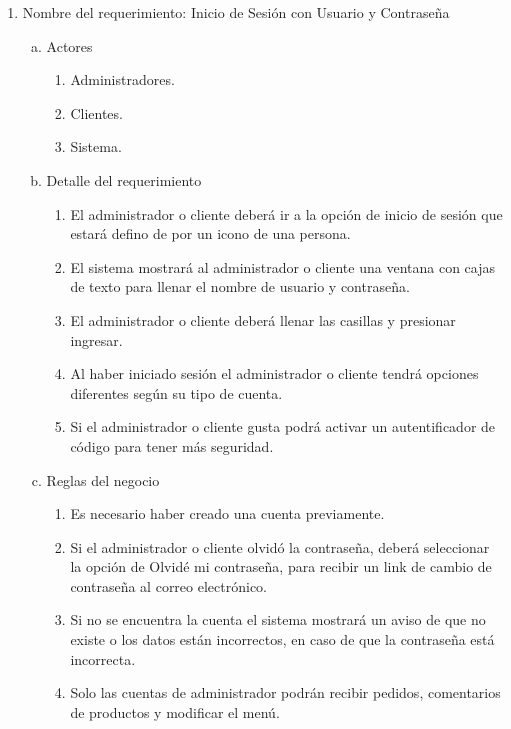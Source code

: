 \documentclass[conference]{IEEEtran}
\begin{document}
\begin{enumerate}
\item Nombre del requerimiento: Inicio de Sesión con Usuario y Contraseña
\begin{enumerate}[a)]
\item Actores
	\begin{enumerate}[a]
	\item Administradores.
	\item Clientes.
	\item Sistema. 
	\end{enumerate}
\item Detalle del requerimiento
	\begin{enumerate}[P{a}so 1.]
	\item El administrador o cliente deberá ir a la opción de inicio de sesión que estará defino de por un icono de una persona. 
	\item El sistema mostrará al administrador o cliente una ventana con cajas de texto para llenar el nombre de usuario y contraseña. 
	\item El administrador o cliente deberá llenar las casillas y presionar ingresar. 
	\item Al haber iniciado sesión el administrador o cliente tendrá opciones diferentes según su tipo de cuenta. 
	\item Si el administrador o cliente gusta podrá activar un autentificador de código para tener más seguridad. 
	\end{enumerate}
\item Reglas del negocio
	\begin{enumerate}[a]
	\item Es necesario haber creado una cuenta previamente. 
	\item Si el administrador o cliente olvidó la contraseña, deberá seleccionar la opción de Olvidé mi contraseña, para recibir un link de cambio de contraseña al correo electrónico. 
	\item Si no se encuentra la cuenta el sistema mostrará un aviso de que no existe o los datos están incorrectos, en caso de que la contraseña está incorrecta. 
	\item Solo las cuentas de administrador podrán recibir pedidos, comentarios de productos y modificar el menú. 
	\end{enumerate}
\end{enumerate}


\end{enumerate}
\end{document}
